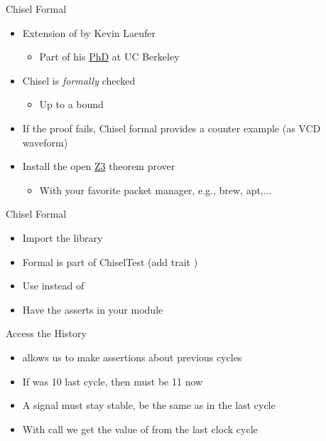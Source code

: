 \begin{frame}[fragile]{Chisel Formal}
\begin{itemize}
\item Extension of  by Kevin Laeufer
\begin{itemize}
\item Part of his \href{https://www2.eecs.berkeley.edu/Pubs/TechRpts/2024/EECS-2024-157.pdf}{PhD} at UC Berkeley
\end{itemize}
\item Chisel  is \emph{formally} checked
\begin{itemize}
\item Up to a bound
\end{itemize}
\item If the proof fails, Chisel formal provides a counter example (as VCD waveform)
\item Install the open \href{https://github.com/Z3Prover/z3}{Z3} theorem prover
\begin{itemize}
\item With your favorite packet manager, e.g., brew, apt,...
\end{itemize}
\end{itemize}
\end{frame}

\begin{frame}[fragile]{Chisel Formal}
\begin{itemize}
\item Import the library
\item Formal is part of ChiselTest (add trait )
\item Use  instead of 
\item Have the asserts in your module
\end{itemize}
\end{frame}

\begin{frame}[fragile]{Access the History}
\begin{itemize}
\item {} allows us to make assertions about previous cycles
\item If  was 10 last cycle, then  must be 11 now
\item A signal must stay stable, be the same as in the last cycle
\item With  call we get the value of  from the last clock cycle
\end{itemize}
\end{frame}

